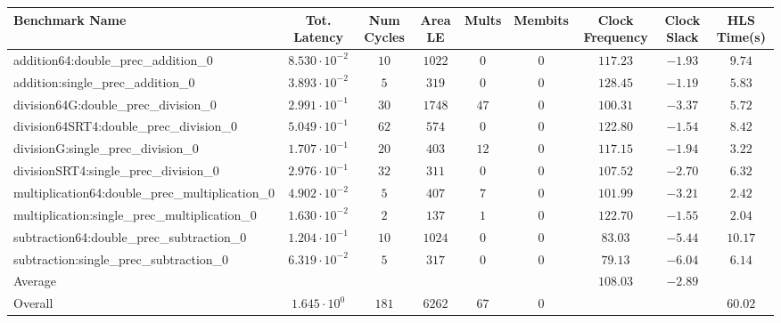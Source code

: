 \begin{tabular}{|l|c|c|c|c|c|c|c|c|}
\hline
Benchmark Name                                   & Tot. Latency            & Num Cycles & Area LE  & Mults  & Membits & Clock Frequency & Clock Slack & HLS Time(s) \\
\hline
addition64:double\_prec\_addition\_0             & $ 8.530 \cdot 10^{-2} $ & $ 10     $ & $ 1022 $ & $ 0  $ & $ 0   $ & $ 117.23      $ & $ -1.93   $ & $ 9.74    $ \\
addition:single\_prec\_addition\_0               & $ 3.893 \cdot 10^{-2} $ & $ 5      $ & $ 319  $ & $ 0  $ & $ 0   $ & $ 128.45      $ & $ -1.19   $ & $ 5.83    $ \\
division64G:double\_prec\_division\_0            & $ 2.991 \cdot 10^{-1} $ & $ 30     $ & $ 1748 $ & $ 47 $ & $ 0   $ & $ 100.31      $ & $ -3.37   $ & $ 5.72    $ \\
division64SRT4:double\_prec\_division\_0         & $ 5.049 \cdot 10^{-1} $ & $ 62     $ & $ 574  $ & $ 0  $ & $ 0   $ & $ 122.80      $ & $ -1.54   $ & $ 8.42    $ \\
divisionG:single\_prec\_division\_0              & $ 1.707 \cdot 10^{-1} $ & $ 20     $ & $ 403  $ & $ 12 $ & $ 0   $ & $ 117.15      $ & $ -1.94   $ & $ 3.22    $ \\
divisionSRT4:single\_prec\_division\_0           & $ 2.976 \cdot 10^{-1} $ & $ 32     $ & $ 311  $ & $ 0  $ & $ 0   $ & $ 107.52      $ & $ -2.70   $ & $ 6.32    $ \\
multiplication64:double\_prec\_multiplication\_0 & $ 4.902 \cdot 10^{-2} $ & $ 5      $ & $ 407  $ & $ 7  $ & $ 0   $ & $ 101.99      $ & $ -3.21   $ & $ 2.42    $ \\
multiplication:single\_prec\_multiplication\_0   & $ 1.630 \cdot 10^{-2} $ & $ 2      $ & $ 137  $ & $ 1  $ & $ 0   $ & $ 122.70      $ & $ -1.55   $ & $ 2.04    $ \\
subtraction64:double\_prec\_subtraction\_0       & $ 1.204 \cdot 10^{-1} $ & $ 10     $ & $ 1024 $ & $ 0  $ & $ 0   $ & $ 83.03       $ & $ -5.44   $ & $ 10.17   $ \\
subtraction:single\_prec\_subtraction\_0         & $ 6.319 \cdot 10^{-2} $ & $ 5      $ & $ 317  $ & $ 0  $ & $ 0   $ & $ 79.13       $ & $ -6.04   $ & $ 6.14    $ \\
\hline
Average                                          & $                     $ & $        $ & $      $ & $    $ & $     $ & $ 108.03      $ & $ -2.89   $ & $         $ \\
\hline
Overall                                          & $ 1.645 \cdot 10^{0}  $ & $ 181    $ & $ 6262 $ & $ 67 $ & $ 0   $ & $             $ & $         $ & $ 60.02   $ \\
\hline
\end{tabular}
